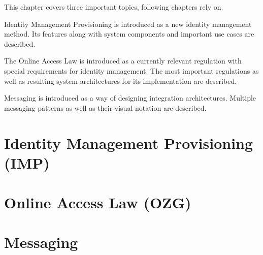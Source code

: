 This chapter covers three important topics, following chapters rely on.

Identity Management Provisioning is introduced as a new identity management method. Its features along with system components and important use cases are described. 

The Online Access Law is introduced as a currently relevant regulation with special requirements for identity management. The most important regulations as well as resulting system architectures for its implementation are described.

Messaging is introduced as a way of designing integration architectures. Multiple messaging patterns as well as their visual notation are described.

\section{Identity Management Provisioning (IMP)}


\section{Online Access Law (OZG)}


\section{Messaging}
